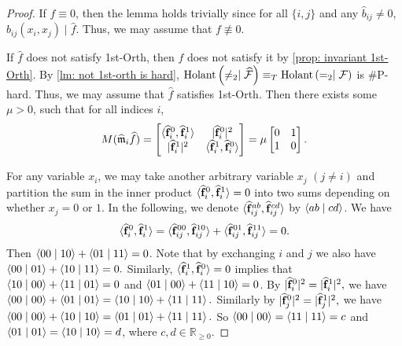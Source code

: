 \begin{proof}
    If $\widehat{f}\equiv 0$, then the lemma holds trivially since for all $\{i, j\}$ and any $\widehat{b}_{ij}\neq 0$, $\widehat{b}_{ij}(x_i, x_j)\mid \widehat{f}$.
    Thus, we may assume that $f\not\equiv 0$.
  
    If $\widehat{f}$ does not satisfy {\sc 1st-Orth}, then $f$ does not satisfy it by \cref{prop: invariant 1st-Orth}. 
    By \cref{lm: not 1st-orth is hard}, $\operatorname{Holant}\left(\neq_2\mid \widehat{\mathcal{F}}\right)\equiv_T\operatorname{Holant}\left(=_2\mid \mathcal{F}\right)$ is \#P-hard. 
    Thus, we may assume that $\widehat{f}$ satisfies {\sc 1st-Orth}. 
    Then there exists some $\mu>0$, such that for all indices $i$, 
    $$M(\widehat{\mathfrak{m}}_i\widehat{f})
    =\left[\begin{matrix}
    \langle \widehat{{\bf f}}_i^0, \widehat{{\bf f}}_i^1 \rangle & |\widehat{{\bf f}}_i^0|^2\\
    |\widehat{{\bf f}}_i^1|^2 & \langle \widehat{{\bf f}}_i^1, \widehat{{\bf f}}_i^0 \rangle
    \end{matrix}\right]=
    \mu\left[\begin{matrix}
    0 & 1 \\
     1 & 0
    \end{matrix}\right].
    $$
    
    For any variable $x_i$, we may take another arbitrary variable $x_j$ $(j\neq i)$ and partition the sum in the inner product $\langle \widehat{{\bf f}}_i^0, \widehat{{\bf f}}_i^1\rangle=0$ into two sums depending on whether $x_j=0$ or $1$.
    In the following, we denote $\langle \widehat{{\bf f}}_{ij}^{ab}, \widehat{{\bf f}}_{ij}^{cd} \rangle$ 
    by $\braket{ab\mid cd}$.
    We have 
    $$\langle \widehat{{\bf f}}_i^0, \widehat{{\bf f}}_i^1 \rangle
    = 
    \langle \widehat{{\bf f}}_{ij}^{00}, \widehat{{\bf f}}_{ij}^{10} \rangle+\langle \widehat{{\bf f}}_{ij}^{01}, \widehat{{\bf f}}_{ij}^{11}\rangle 
    =0.$$
    Then $\textcolor{black}{\braket{00\mid 10}}+\textcolor{black}{\braket{01\mid 11}}=0$.
    Note that by exchanging $i$ and $j$ we also have $\textcolor{black}{\braket{00\mid 01}}+\textcolor{black}{\braket{10\mid 11}}=0.$
    Similarly, $\braket{\widehat{\bf f}_i^1, \widehat{\bf f}_i^0}=0$ implies that $\textcolor{black}{\braket{10\mid 00}}+\textcolor{black}{\braket{11\mid 01}}=0$ and $\textcolor{black}{\braket{01\mid 00}}+\textcolor{black}{\braket{11\mid 10}}=0$.
    By $|\widehat{{\bf f}}_i^0|^2=|\widehat{{\bf f}}_i^1|^2,$ we have $\braket{00\mid 00}+\braket{01\mid 01}=\braket{10\mid 10}+\braket{11\mid 11}.$
    Similarly by $|\widehat{{\bf f}}_j^0|^2=|\widehat{{\bf f}}_j^1|^2,$ we have $\braket{00\mid 00}+\braket{10\mid 10}=\braket{01\mid 01}+\braket{11\mid 11}.$
    So $\braket{00\mid 00}=\braket{11\mid 11}=c$ and $\braket{01\mid 01}=\braket{10\mid 10}=d$, where $c,d\in \mathbb{R}_{\ge 0}.$ 
    

\end{proof}
